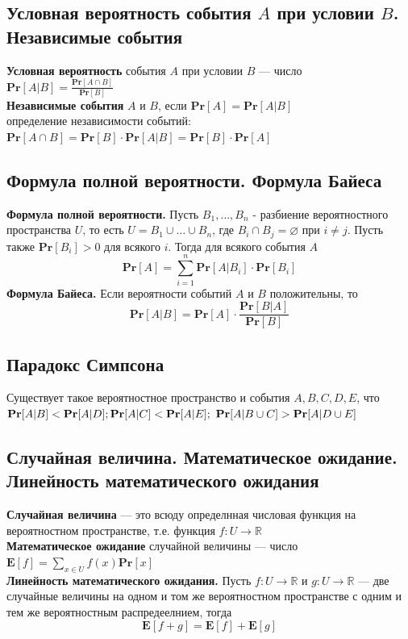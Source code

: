 \documentclass[a4paper]{article}
\begin{document}
\subsection{Условная вероятность события \texorpdfstring{$A$}{A} при условии \texorpdfstring{$B$}{B}. Независимые события}
\textbf{Условная вероятность} события $A$ при условии $B$ — число $\boxed{\textbf{Pr}[A|B]=\displaystyle\frac{\textbf{Pr}[A\cap B]}{\textbf{Pr}[B]}}$\\[2mm]
\indent\textbf{Независимые события} $A$ и $B$, если $\boxed{\textbf{Pr}[A]=\textbf{Pr}[A|B]}$\\[2mm]
 определение независимости событий:
$\boxed{
\textbf{Pr}[A \cap B]=\textbf{Pr}[B] \cdot \textbf{Pr}[A|B]=\textbf{Pr}[B] \cdot \textbf{Pr}[A]}
$

\subsection{Формула полной вероятности. Формула Байеса}
\textbf{Формула полной вероятности.} Пусть $B_1, \ldots, B_n$ - разбиение вероятностного пространства $U$, то есть $U=B_1 \cup \ldots \cup B_n$, где $B_i \cap B_j=\varnothing$ при $i \neq j$. Пусть также $\textbf{Pr}\left[B_i\right]>0$ для всякого $i$. Тогда для всякого события $A$
$$\boxed{
\textbf{Pr}[A]=\sum_{i=1}^n \textbf{Pr}\left[A | B_i\right] \cdot \textbf{Pr}\left[B_i\right]}
$$
\indent\textbf{Формула Байеса.} Если вероятности событий $A$ и $B$ положительны, то $$\boxed{\textbf{Pr}[A|B]=\textbf{Pr}[A]\cdot\displaystyle\frac{\textbf{Pr}[B|A]}{\textbf{Pr}[B]}}$$


\subsection{Парадокс Симпсона}
Существует такое вероятностное пространство и события $A,B,C,D,E$, что $\textbf{Pr}[A|B]<\textbf{Pr}[A|D];\newline \textbf{Pr}[A|C]<\textbf{Pr}[A|E];\ \textbf{Pr}[A|B\cup C]>\textbf{Pr}[A|D\cup E]$


\subsection{Случайная величина. Математическое ожидание. Линейность математического ожидания}
\textbf{Случайная величина} — это всюду определнная числовая функция на вероятностном пространстве, т.е. функция $f:U\to \mathbb{R}$\\[2mm]
\indent\textbf{Математическое ожидание} случайной величины — число $\boxed{\textbf{E}[f]=\displaystyle\sum_{x\in U} f(x)\textbf{Pr}[x]}$\\[2mm]
\indent\textbf{Линейность математического ожидания.} Пусть $f:U\to\mathbb{R}\textrm{ и }g:U\to\mathbb{R}$ — две случайные величины на одном и том же вероятностном пространстве с одним и тем же вероятностным распредеелнием, тогда $$\textbf{E}[f+g]=\textbf{E}[f]+\textbf{E}[g]$$
\end{document}
